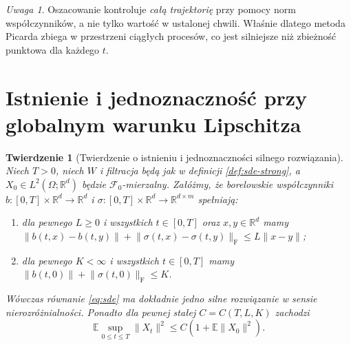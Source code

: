\documentclass[11pt,a4paper,oneside]{report}
\numberwithin{equation}{chapter}
\theoremstyle{plain}
\newtheorem{twierdzenie}{Twierdzenie}[chapter]
\theoremstyle{definition}
\theoremstyle{remark}
\newtheorem{uwaga}{Uwaga}[chapter]
\newcommand{\R}{\mathbb{R}}
\newcommand{\E}{\mathbb{E}}
\newcommand{\calF}{\mathcal{F}}
\newcommand{\norm}[1]{\lVert #1\rVert}
\begin{document}
\begin{uwaga}
Oszacowanie kontroluje \emph{całą trajektorię} przy pomocy
norm współczynników, a nie tylko wartość w ustalonej chwili.
Właśnie dlatego metoda Picarda zbiega w przestrzeni
ciągłych procesów, co jest silniejsze niż zbieżność
punktowa dla każdego $t$.
\end{uwaga}

\section{Istnienie i jednoznaczność przy globalnym warunku Lipschitza}
\begin{twierdzenie}[Twierdzenie o istnieniu i jednoznaczności silnego rozwiązania]
\label{th:sde-global}
Niech $T>0$, niech $W$ i filtracja będą jak w definicji
\ref{def:sde-strong}, a $X_0\in L^2(\Omega;\R^d)$ będzie
$\calF_0$-mierzalny. Załóżmy, że borelowskie współczynniki
$b:[0,T]\times\R^d\to\R^d$ i
$\sigma:[0,T]\times\R^d\to\R^{d\times m}$ spełniają:
\begin{enumerate}[label=(\roman*)]
\item dla pewnego $L\ge0$ i wszystkich $t\in[0,T]$ oraz
$x,y\in\R^d$ mamy
$\norm{b(t,x)-b(t,y)}+\norm{\sigma(t,x)-\sigma(t,y)}_{\mathrm F}
\le L\norm{x-y}$;
\item dla pewnego $K<\infty$ i wszystkich $t\in[0,T]$
mamy $\norm{b(t,0)}+\norm{\sigma(t,0)}_{\mathrm F}\le K$.
\end{enumerate}
Wówczas równanie \eqref{eq:sde} ma dokładnie jedno silne
rozwiązanie w sensie nierozróżnialności. Ponadto dla pewnej
stałej $C=C(T,L,K)$ zachodzi
\[
\E\sup_{0\le t\le T}\norm{X_t}^2
\le C(1+\E\norm{X_0}^2).
\tag{5.3}\label{eq:sde-moment}
\]
\end{twierdzenie}
\end{document}

